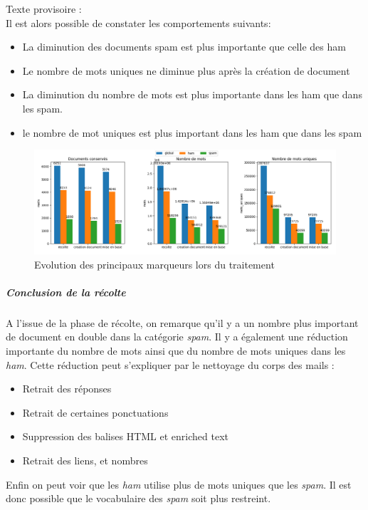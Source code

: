 \documentclass[a4paper,12pt]{article}
\begin{document}
			Texte provisoire : \\
			Il est alors possible de constater les comportements suivants:
			\begin{itemize}
				\item La diminution des documents spam est plus importante que celle des ham 
				\item Le nombre de mots uniques ne diminue plus après la création de document
				\item La diminution du nombre de mots est plus importante dans les ham que dans les spam. 
				\item le nombre de mot uniques est plus important dans les ham que dans les spam
			\end{itemize}
			
			\begin{figure}[H]
				\includegraphics[width=\linewidth]{img/Statsrecolte.png}
				\caption{Evolution des principaux marqueurs lors du traitement}
			\end{figure}
		
			\subparagraph{Conclusion de la récolte}
				A l'issue de la phase de récolte, on remarque qu'il y a un nombre plus important de document en double dans la catégorie \emph{spam}.				
				Il y a également une réduction importante du nombre de mots ainsi que du nombre de mots uniques dans les \emph{ham}. Cette réduction peut s'expliquer par le nettoyage du corps des mails :
				\begin{itemize}
					\item Retrait des réponses
					\item Retrait de certaines ponctuations
					\item Suppression des balises HTML et enriched text
					\item Retrait des liens, et nombres
				\end{itemize}
				
				
				Enfin on peut voir que les \emph{ham} utilise plus de mots uniques que les \emph{spam}. Il est donc possible que le vocabulaire des \emph{spam} soit plus restreint. 
			
\end{document}
